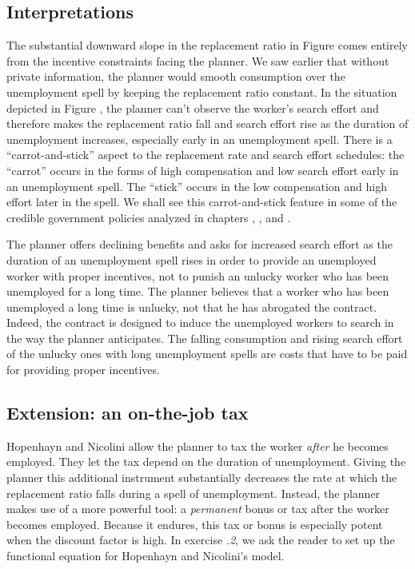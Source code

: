 \subsection{Interpretations}
The substantial downward slope in the replacement ratio in Figure  %
comes entirely  from the incentive constraints facing the
planner.   We saw earlier that without private information, the
planner would smooth consumption
over the unemployment spell by
keeping the  replacement ratio constant. In the situation depicted in
Figure , the planner can't observe the worker's search effort
and therefore makes   the replacement ratio  fall and search
effort rise as the duration of unemployment increases, especially
early in an unemployment spell.   There is a ``carrot-and-stick''
aspect to the replacement rate and search effort  schedules: the
``carrot'' occurs in the forms of high compensation and low search
effort early in an unemployment spell.  The ``stick''
occurs in the low compensation and high effort  later in
the spell.   We shall see  this carrot-and-stick feature in some of the
credible government policies analyzed in chapters , , and
.

The planner offers declining benefits and asks for increased search
effort as the duration of an unemployment spell rises in order to provide an
unemployed worker with proper incentives, not to punish an unlucky worker
who has been unemployed for a long time.  The planner believes that a
worker who has been unemployed a long time is unlucky, not that he has
abrogated the contract.  Indeed, the
contract is designed to induce the unemployed workers to search in
the way the planner anticipates.  The falling consumption and rising
search effort of the unlucky ones with long unemployment spells are
costs that have to be paid for  providing
proper incentives.


\subsection{Extension: an on-the-job tax}
 Hopenhayn and Nicolini allow the planner to tax the worker {\it after\/}
he becomes employed. They let the tax depend on the duration of unemployment.
Giving the planner this additional instrument substantially decreases the
rate at which the replacement ratio falls during a spell of unemployment.
Instead, the planner makes use of a more powerful tool: a {\it permanent\/}
bonus or tax after the worker becomes employed.  Because it endures, this
tax or bonus is especially potent when the discount factor is high.  In
exercise {\it \the\chapternum.2\/}, we ask the reader to set up the functional equation for
Hopenhayn and Nicolini's model.

